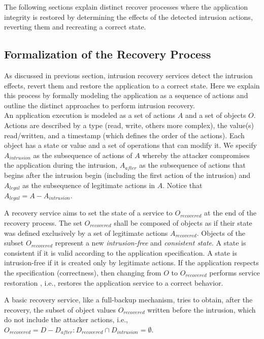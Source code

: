 The following sections explain distinct recover processes where the application integrity is restored by determining the effects of the detected intrusion actions, reverting them and recreating a correct state. 

\subsection{Formalization of the Recovery Process}
\label{sec:related:recovery_models}
As discussed in previous section, intrusion recovery services detect the intrusion effects, revert them and restore the application to a correct state. Here we explain this process by formally modeling the application as a sequence of actions and outline the distinct approaches to perform intrusion recovery. \\ 

An application execution is modeled as a set of actions $A$ and a set of objects $O$. Actions are described by a type (read, write, others more complex), the value(s) read/written, and a timestamp (which defines the order of the actions). Each object has a state or value and a set of operations that can modify it. We specify $A_{intrusion}$ as the subsequence of actions of $A$ whereby the attacker compromises the application during the intrusion, $A_{after}$ as the subsequence of actions that begins after the intrusion begin (including the first action of the intrusion) and $A_{legal}$ as the subsequence of legitimate actions in $A$. Notice that $A_{legal} = A - A_{intrusion}$. 

A recovery service aims to set the state of a service to $O_{recovered}$ at the end of the recovery process. The set $O_{recovered}$ shall be composed of objects as if their state was defined exclusively by a set of legitimate actions $A_{recovered}$. Objects of the subset $O_{recovered}$ represent a new \textit{intrusion-free} and \textit{consistent state}. A state is consistent if it is valid according to the application specification. A state is intrusion-free if it is created only by legitimate actions. If the application respects the specification (correctness), then changing from $O$ to $O_{recovered}$ performs service restoration \cite{Aviz}, i.e., restores the application service to a correct behavior.

A basic recovery service, like a full-backup mechanism, tries to obtain, after the recovery, the subset of object values $O_{recovered}$ written before the intrusion, which do not include the attacker actions, i.e., $O_{recovered} = D - D_{after} : D_{recovered} \cap D_{intrusion} = \emptyset$.

